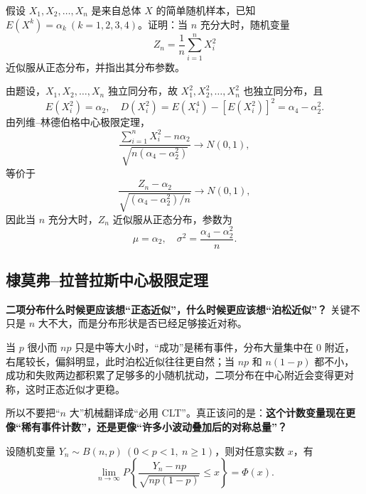 ﻿\documentclass[lang=cn,11pt]{elegantbook}
\begin{document}
\begin{exercise}\label{exer:5-clt-moment}
假设 \(X_1, X_2, \dots, X_n\) 是来自总体 \(X\) 的简单随机样本，已知 \(E(X^k) = \alpha_k\ (k = 1,2,3,4)\)。证明：当 \(n\) 充分大时，随机变量
\[
Z_n = \frac{1}{n}\sum_{i=1}^{n} X_i^2
\]
近似服从正态分布，并指出其分布参数。
\end{exercise}
\begin{solution}
由题设，\(X_1, X_2, \dots, X_n\) 独立同分布，故 \(X_1^2, X_2^2, \dots, X_n^2\) 也独立同分布，且
\[
E(X_i^2) = \alpha_2,\quad D(X_i^2) = E(X_i^4) - [E(X_i^2)]^2 = \alpha_4 - \alpha_2^2.
\]
由列维--林德伯格中心极限定理，
\[
\frac{\sum_{i=1}^{n} X_i^2 - n\alpha_2}{\sqrt{n(\alpha_4 - \alpha_2^2)}} \to N(0,1),
\]
等价于
\[
\frac{Z_n - \alpha_2}{\sqrt{(\alpha_4 - \alpha_2^2)/n}} \to N(0,1),
\]
因此当 \(n\) 充分大时，\(Z_n\) 近似服从正态分布，参数为
\[
\mu = \alpha_2,\quad \sigma^2 = \frac{\alpha_4 - \alpha_2^2}{n}.
\]
\end{solution}


\subsection{棣莫弗--拉普拉斯中心极限定理}

\begin{note}
\textbf{二项分布什么时候更应该想“正态近似”，什么时候更应该想“泊松近似”？} 关键不只是 \(n\) 大不大，而是分布形状是否已经足够接近对称。

当 \(p\) 很小而 \(np\) 只是中等大小时，“成功”是稀有事件，分布大量集中在 0 附近，右尾较长，偏斜明显，此时泊松近似往往更自然；当 \(np\) 和 \(n(1-p)\) 都不小，成功和失败两边都积累了足够多的小随机扰动，二项分布在中心附近会变得更对称，这时正态近似才更稳。

所以不要把“\(n\) 大”机械翻译成“必用 CLT”。真正该问的是：\textbf{这个计数变量现在更像“稀有事件计数”，还是更像“许多小波动叠加后的对称总量”？}
\end{note}

\begin{theorem} \label{thm:demoivre-laplace}
设随机变量 \(Y_n \sim B(n, p)\ (0 < p < 1,\ n \geq 1)\)，则对任意实数 \(x\)，有
\[
\lim_{n\to\infty} P\!\left\{\frac{Y_n - np}{\sqrt{np(1-p)}} \leq x\right\} = \Phi(x).
\]
\end{theorem}
\end{document}
